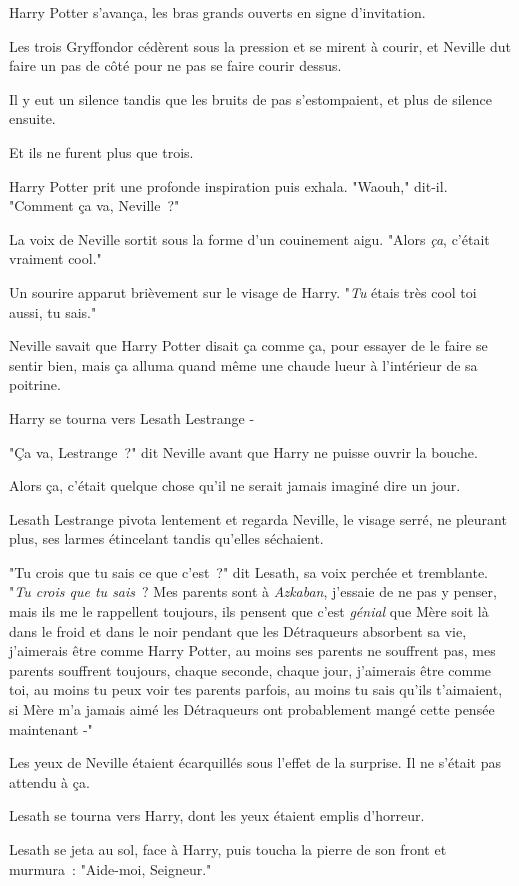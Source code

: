 Harry Potter s'avança, les bras grands ouverts en signe d'invitation.

Les trois Gryffondor cédèrent sous la pression et se mirent à courir, et Neville dut faire un pas de côté pour ne pas se faire courir dessus.

Il y eut un silence tandis que les bruits de pas s'estompaient, et plus de silence ensuite.

Et ils ne furent plus que trois.

Harry Potter prit une profonde inspiration puis exhala. "Waouh," dit-il. "Comment ça va, Neville~?"

La voix de Neville sortit sous la forme d'un couinement aigu. "Alors \emph{ça}, c'était vraiment cool."

Un sourire apparut brièvement sur le visage de Harry. "\emph{Tu} étais très cool toi aussi, tu sais."

Neville savait que Harry Potter disait ça comme ça, pour essayer de le faire se sentir bien, mais ça alluma quand même une chaude lueur à l'intérieur de sa poitrine.

Harry se tourna vers Lesath Lestrange -

"Ça va, Lestrange~?" dit Neville avant que Harry ne puisse ouvrir la bouche.

Alors ça, c'était quelque chose qu'il ne serait jamais imaginé dire un jour.

Lesath Lestrange pivota lentement et regarda Neville, le visage serré, ne pleurant plus, ses larmes étincelant tandis qu'elles séchaient.

"Tu crois que tu sais ce que c'est~?" dit Lesath, sa voix perchée et tremblante. "\emph{Tu crois que tu sais}~? Mes parents sont à \emph{Azkaban}, j'essaie de ne pas y penser, mais ils me le rappellent toujours, ils pensent que c'est \emph{génial} que Mère soit là dans le froid et dans le noir pendant que les Détraqueurs absorbent sa vie, j'aimerais être comme Harry Potter, au moins ses parents ne souffrent pas, mes parents souffrent toujours, chaque seconde, chaque jour, j'aimerais être comme toi, au moins tu peux voir tes parents parfois, au moins tu sais qu'ils t'aimaient, si Mère m'a jamais aimé les Détraqueurs ont probablement mangé cette pensée maintenant -"

Les yeux de Neville étaient écarquillés sous l'effet de la surprise. Il ne s'était pas attendu à ça.

Lesath se tourna vers Harry, dont les yeux étaient emplis d'horreur.

Lesath se jeta au sol, face à Harry, puis toucha la pierre de son front et murmura~: "Aide-moi, Seigneur."

